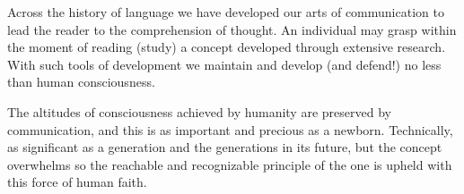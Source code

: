 


Across the history of language we have developed our arts of
communication to lead the reader to the comprehension of thought.  An
individual may grasp within the moment of reading (study) a concept
developed through extensive research.  With such tools of development
we maintain and develop (and defend!) no less than human
consciousness.

The altitudes of consciousness achieved by humanity are preserved by
communication, and this is as important and precious as a newborn.
Technically, as significant as a generation and the generations in its
future, but the concept overwhelms so the reachable and recognizable
principle of the one is upheld with this force of human faith.



\bye
